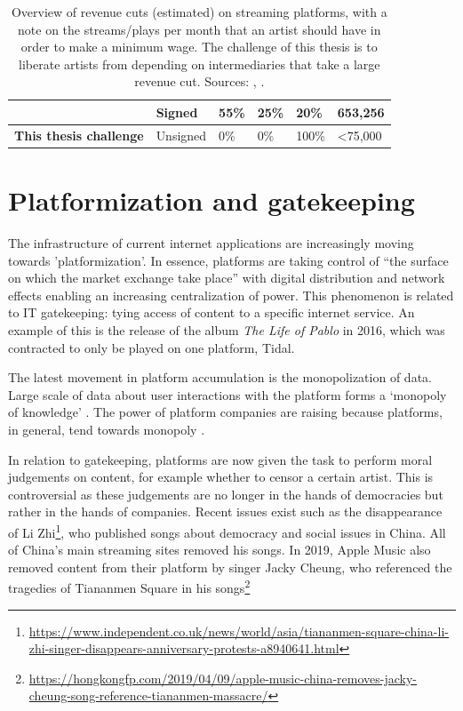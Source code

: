 \begin{table}[]
\begin{tabular}{|l|l|l|l|l|l|}
                               & Signed                      & 55\%               & 25\%                  & 20\%                     & 653,256                                                                                                    \\ \hline
\textbf{This thesis challenge} & Unsigned                    & 0\%                & 0\%                   & 100\%                    & \textless 75,000                                                                                           \\ \hline
\end{tabular}
\caption{Overview of revenue cuts (estimated) on streaming platforms, with a note on the streams/plays per month that an artist should have in order to make a minimum wage. The challenge of this thesis is to liberate artists from depending on intermediaries that take a large revenue cut. Sources: \cite{thetrichordist2014}, \cite{digitalmusicnews2018}.}
\label{tab:revenue-cuts}
\end{table}

\section{Platformization and gatekeeping}
The infrastructure of current internet applications are increasingly moving towards 'platformization'. In essence, platforms are taking control of ``the surface on which the market exchange take place'' \citep{andersson2016mastering} with digital distribution and network effects enabling an increasing centralization of power. This phenomenon is related to IT gatekeeping: tying access of content to a specific internet service. An example of this is the release of the album \textit{The Life of Pablo} in 2016, which was contracted to only be played on one platform, Tidal.

The latest movement in platform accumulation is the monopolization of data. Large scale of data about user interactions with the platform forms a `monopoly of knowledge' \citep{innis2007empire}. The power of platform companies are raising because platforms, in general, tend towards monopoly \citep{srnicek2017platform}. 

In relation to gatekeeping, platforms are now given the task to perform moral judgements on content, for example whether to censor a certain artist. This is controversial as these judgements are no longer in the hands of democracies but rather in the hands of companies. Recent issues exist such as the disappearance of Li Zhi\footnote{\url{https://www.independent.co.uk/news/world/asia/tiananmen-square-china-li-zhi-singer-disappears-anniversary-protests-a8940641.html}}, who published songs about democracy and social issues in China. All of China's main streaming sites removed his songs. In 2019, Apple Music also removed content from their platform by singer Jacky Cheung, who referenced the tragedies of Tiananmen Square in his songs\footnote{\url{https://hongkongfp.com/2019/04/09/apple-music-china-removes-jacky-cheung-song-reference-tiananmen-massacre/}}

